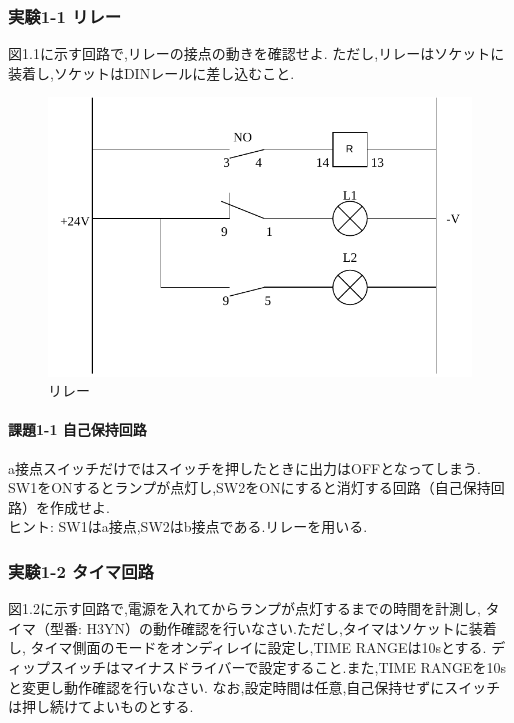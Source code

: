 \subsubsection{実験1-1 リレー}
図1.1に示す回路で,リレーの接点の動きを確認せよ.
ただし,リレーはソケットに装着し,ソケットはDINレールに差し込むこと.

\begin{figure}[h]
  \centering
  \includegraphics[scale=0.5]{sozai/1_compressed.pdf}
  \caption{リレー}
\end{figure}


\paragraph{課題1-1 自己保持回路}
a接点スイッチだけではスイッチを押したときに出力はOFFとなってしまう.
SW1をONするとランプが点灯し,SW2をONにすると消灯する回路（自己保持回路）を作成せよ.\\
ヒント: SW1はa接点,SW2はb接点である.リレーを用いる.

\subsubsection{実験1-2 タイマ回路}
図1.2に示す回路で,電源を入れてからランプが点灯するまでの時間を計測し,
タイマ（型番: H3YN）の動作確認を行いなさい.ただし,タイマはソケットに装着し,
タイマ側面のモードをオンディレイに設定し,TIME RANGEは10sとする.
ディップスイッチはマイナスドライバーで設定すること.また,TIME RANGEを10sと変更し動作確認を行いなさい.
なお,設定時間は任意,自己保持せずにスイッチは押し続けてよいものとする.

